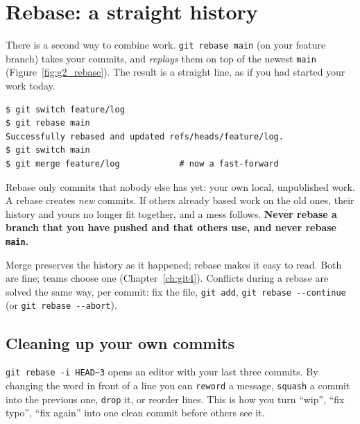 \section*{Rebase: a straight history}
There is a second way to combine work. \texttt{git rebase main} (on your feature branch) takes your commits, and \emph{replays} them on top of the newest \texttt{main} (Figure~\ref{fig:g2_rebase}). The result is a straight line, as if you had started your work today.
\begin{verbatim}
$ git switch feature/log
$ git rebase main
Successfully rebased and updated refs/heads/feature/log.
$ git switch main
$ git merge feature/log            # now a fast-forward
\end{verbatim}
\begin{center}
\label{fig:g2_rebase}
\end{center}
\begin{keyidea}
Rebase only commits that nobody else has yet: your own local, unpublished work. A rebase creates \emph{new} commits. If others already based work on the old ones, their history and yours no longer fit together, and a mess follows. \textbf{Never rebase a branch that you have pushed and that others use, and never rebase \texttt{main}.}
\end{keyidea}
Merge preserves the history as it happened; rebase makes it easy to read. Both are fine; teams choose one (Chapter~\ref{ch:git4}). Conflicts during a rebase are solved the same way, per commit: fix the file, \verb!git add!, \verb!git rebase --continue! (or \verb!git rebase --abort!).

\subsection*{Cleaning up your own commits}
\verb!git rebase -i HEAD~3! opens an editor with your last three commits. By changing the word in front of a line you can \texttt{reword} a message, \texttt{squash} a commit into the previous one, \texttt{drop} it, or reorder lines. This is how you turn ``wip'', ``fix typo'', ``fix again'' into one clean commit before others see it.

